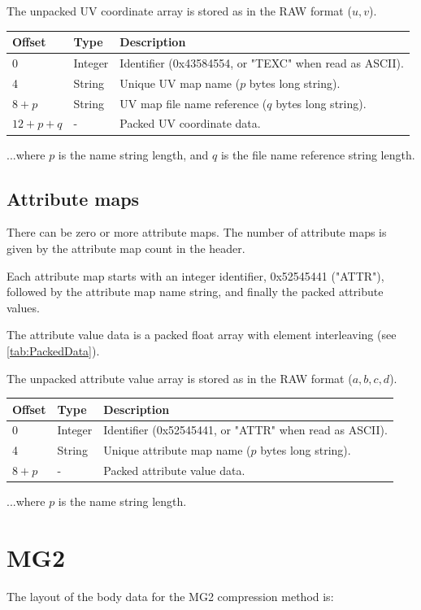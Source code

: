 The unpacked UV coordinate array is stored as in the RAW format ($u, v$).

\begin{tabular}{|l|l|l|}\hline
\textbf{Offset} &  \textbf{Type} & \textbf{Description}\\ \hline
0 & Integer & Identifier (0x43584554, or "TEXC" when read as ASCII).\\ \hline
4 & String & Unique UV map name ($p$ bytes long string).\\ \hline
$8+p$ & String & UV map file name reference ($q$ bytes long string).\\ \hline
$12+p+q$ & - & Packed UV coordinate data.\\ \hline
\end{tabular}

...where $p$ is the name string length, and $q$ is the file name reference string
length.

\subsection{Attribute maps}
There can be zero or more attribute maps. The number of attribute maps is given by the
attribute map count in the header.

Each attribute map starts with an integer identifier, 0x52545441 ("ATTR"), followed
by the attribute map name string, and finally the packed attribute values.

The attribute value data is a packed float array with element interleaving
(see \ref{tab:PackedData}).

The unpacked attribute value array is stored as in the RAW format ($a, b, c, d$).

\begin{tabular}{|l|l|l|}\hline
\textbf{Offset} &  \textbf{Type} & \textbf{Description}\\ \hline
0 & Integer & Identifier (0x52545441, or "ATTR" when read as ASCII).\\ \hline
4 & String & Unique attribute map name ($p$ bytes long string).\\ \hline
$8+p$ & - & Packed attribute value data.\\ \hline
\end{tabular}

...where $p$ is the name string length.


\section{MG2}
The layout of the body data for the MG2 compression method is:

